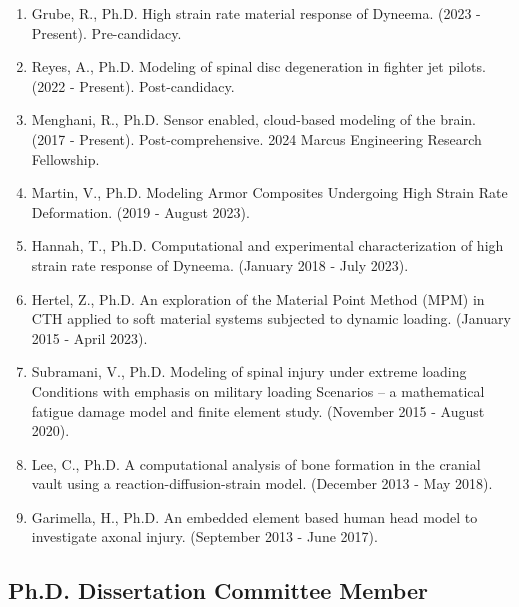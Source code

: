 \documentclass[
]{article}
\begin{document}
\begin{enumerate}
  \def\labelenumi{\arabic{enumi}.}
    \item Grube, R.,
     Ph.D. High strain rate material response of Dyneema. (2023 - Present). Pre-candidacy.
    \item Reyes, A.,
     Ph.D. Modeling of spinal disc degeneration in fighter jet pilots. (2022 - Present). Post-candidacy.
    \item Menghani, R.,
     Ph.D. Sensor enabled, cloud-based modeling of the brain. (2017 - Present). Post-comprehensive. 2024 Marcus Engineering Research Fellowship.
    \item Martin, V.,
     Ph.D. Modeling Armor Composites Undergoing High Strain Rate Deformation. (2019 - August 2023).
    \item Hannah, T.,
     Ph.D. Computational and experimental characterization of high strain rate response of Dyneema. (January 2018 - July 2023).
    \item Hertel, Z.,
     Ph.D. An exploration of the Material Point Method (MPM) in CTH applied to soft material systems subjected to dynamic loading. (January 2015 - April 2023).
    \item Subramani, V.,
     Ph.D. Modeling of spinal injury under extreme loading Conditions with emphasis on military loading Scenarios – a mathematical fatigue damage model and finite element study. (November 2015 - August 2020).
    \item Lee, C., Ph.D.
     A computational analysis of bone formation in the cranial vault using a reaction-diffusion-strain model. (December 2013 - May 2018).
    \item Garimella, H.,
     Ph.D. An embedded element based human head model to investigate axonal injury. (September 2013 - June 2017).
\end{enumerate}

\subsection{Ph.D. Dissertation Committee Member}\label{phd-dissertation-committee-member}
\end{document}
